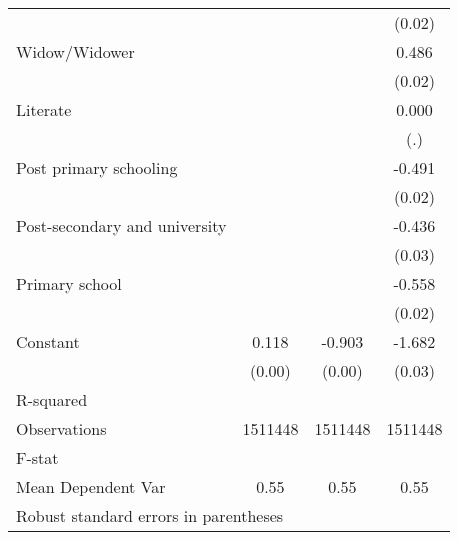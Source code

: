 {\begin{tabular}{l*{3}{c}}
                    &                     &                     &      (0.02)         \\
Widow/Widower       &                     &                     &       0.486\sym{***}\\
                    &                     &                     &      (0.02)         \\
Literate            &                     &                     &       0.000         \\
                    &                     &                     &         (.)         \\
Post primary schooling&                     &                     &      -0.491\sym{***}\\
                    &                     &                     &      (0.02)         \\
Post-secondary and university&                     &                     &      -0.436\sym{***}\\
                    &                     &                     &      (0.03)         \\
Primary school      &                     &                     &      -0.558\sym{***}\\
                    &                     &                     &      (0.02)         \\
Constant            &       0.118\sym{***}&      -0.903\sym{***}&      -1.682\sym{***}\\
                    &      (0.00)         &      (0.00)         &      (0.03)         \\
\hline
R-squared           &                     &                     &                     \\
Observations        &     1511448         &     1511448         &     1511448         \\
F-stat              &                     &                     &                     \\
Mean Dependent Var  &        0.55         &        0.55         &        0.55         \\
\hline\hline
\multicolumn{4}{l}{\footnotesize Robust standard errors in parentheses}\\
\end{tabular}
}
